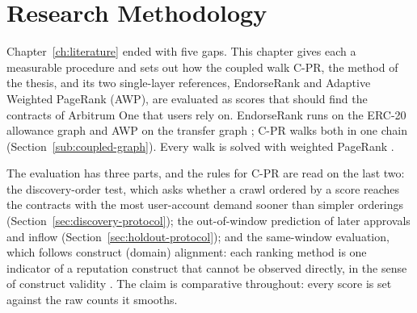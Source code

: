 \chapter{Research Methodology}
\label{ch:methodology}

Chapter~\ref{ch:literature} ended with five gaps. This chapter gives each a measurable procedure and sets out how the coupled walk \mbox{C-PR}, the method of the thesis, and its two single-layer references, EndorseRank and Adaptive Weighted PageRank (AWP), are evaluated as scores that should find the contracts of Arbitrum One that users rely on. EndorseRank runs on the ERC-20 allowance graph and AWP on the transfer graph \parencite{do2023awp}; \mbox{C-PR} walks both in one chain (Section~\ref{sub:coupled-graph}). Every walk is solved with weighted PageRank \parencite{page1999pagerank}.

The evaluation has three parts, and the rules for \mbox{C-PR} are read on the last two: the discovery-order test, which asks whether a crawl ordered by a score reaches the contracts with the most user-account demand sooner than simpler orderings (Section~\ref{sec:discovery-protocol}); the out-of-window prediction of later approvals and inflow (Section~\ref{sec:holdout-protocol}); and the same-window evaluation, which follows construct (domain) alignment: each ranking method is one indicator of a reputation construct that cannot be observed directly, in the sense of construct validity \parencite{cronbach1955construct}. The claim is comparative throughout: every score is set against the raw counts it smooths.

